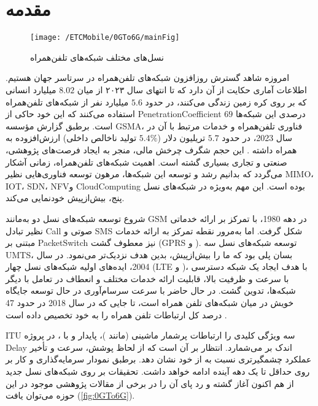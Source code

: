 \chapter{مقدمه}
\label{chap:intro}

\begin{figure}
\texttt{[image: /ETCMobile/0GTo6G/mainFig]}
\caption{
نسل‌های مختلف شبکه‌های تلفن‌همراه
}
\label{fig:0GTo6G}
\end{figure}
امروزه شاهد گسترش روزافزون شبکه‌های تلفن‌همراه در سرتاسر جهان هستیم. اطلاعات آماری حکایت از آن دارد که تا انتهای سال ۲۰۲۳ از میان 
$8.02$
میلیارد انسانی که بر روی کره زمین زندگی می‌کنند، در حدود 
$5.6$
میلیارد نفر از شبکه‌های تلفن‌همراه استفاده می‌کنند که این خود حاکی از
\gls{PenetrationCoefficient} $69$
درصدی این شبکه‌ها است. برطبق گزارش مؤسسه
\gls{GSMA}،
فناوری تلفن‌همراه و خدمات مرتبط با آن در سال 2023، در حدود 
$5.7$
تریلیون دلار ($5.4\%$ تولید ناخالص داخلی) ارزش‌افزوده به همراه داشته
\cite{GSMA2024MobileEconomy}.
این حجم شگرف چرخش مالی، منجر به ایجاد فرصت‌های پژوهشی، صنعتی و تجاری بسیاری گشته است. اهمیت شبکه‌های تلفن‌همراه، زمانی آشکار می‌گردد که بدانیم رشد و توسعه این شبکه‌ها، مرهون توسعه فناوری‌‌هایی نظیر 
\gls{MIMO}، \gls{IOT}، \gls{SDN}، \gls{NFV}و \gls{CloudComputing}
بوده است. این مهم به‌ویژه در شبکه‌های نسل پنج، بیش‌ازپیش خودنمایی می‌کند. 

شروع توسعه شبکه‌های نسل دو به‌مانند 
\gls{GSM}
در دهه 1980، با تمرکز بر ارائه خدماتی نظیر تبادل
\gls{Call} صوتی و \gls{SMS}
شکل گرفت. اما به‌مرور نقطه تمرکز به ارائه خدمات مبتنی بر 
\gls{PacketSwitch}
نیز معطوف گشت
(\gls{GPRS} و ).
توسعه شبکه‌های نسل سه
\gls{UMTS}،
بسان پلی بود که ما را بیش‌ازپیش، بدین هدف نزدیک‌تر می‌نمود. در سال 2004، ایده‌های اولیه شبکه‌های نسل چهار 
(\gls{LTE} و )،
با هدف ایجاد یک شبکه دسترسی با سرعت و ظرفیت بالا، قابلیت ارائه خدمات مختلف و انعطاف در تعامل با دیگر شبکه‌ها، تدوین گشت. در حال حاضر 
با سرعت سرسام‌آوری در حال توسعه جایگاه خویش در میان شبکه‌های تلفن همراه است، تا جایی که در سال 2018 در حدود 47 درصد کل ارتباطات تلفن همراه را به خود تخصیص داده است
\cite{globenewswire2019}. 




\gls{ITU} 
در پروژه‎ 
، 
سه ویژگی کلیدی 
را ارتباطات پرشمار ماشینی (مانند 
)، 
پایدار و با 
\gls{Delay} 
اندک بر می‌شمارد. انتظار بر آن است که 
از لحاظ پوشش، سرعت و تأخیر عملکرد چشمگیرتری نسبت به 
از خود نشان دهد. برطبق نمودار 
سرمایه‌گذاری و کار بر روی 
حداقل تا یک دهه آینده ادامه خواهد داشت. تحقیقات بر روی شبکه‌های نسل جدید 
از هم اکنون آغاز گشته و رد پای آن را در برخی از مقالات پژوهشی موجود در این حوزه می‌توان یافت 
(\autoref{fig:0GTo6G}).




